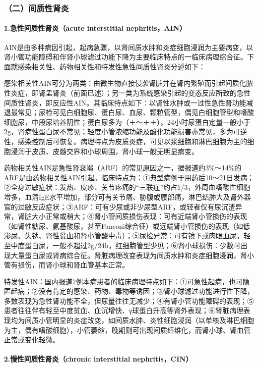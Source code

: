 \subsubsection{（二）间质性肾炎}

\paragraph{1.急性间质性肾炎（acute interstitial nephritis，AIN）}

AIN是由多种病因引起，起病急骤，以肾间质水肿和炎症细胞浸润为主要病变，以肾小管功能障碍和伴肾小球滤过功能下降为主要临床特点的一临床病理综合征。下面就感染相关性、药物相关性和特发性急性间质性肾炎分述如下：

感染相关性AIN可分为两类：由微生物直接侵袭肾脏并在肾内繁殖而引起间质化脓性炎症，即肾盂肾炎（前面已述）；另一类为系统感染引起的变态反应所致的急性间质性肾炎，即反应性AIN。其临床特点如下：以肾性水肿或一过性急性肾功能减退最常见；尿检可见白细胞尿、蛋白尿、血尿、颗粒管型，偶见白细胞管型和嗜酸细胞尿，中段尿培养阴性；蛋白尿多为（＋～＋＋），24小时尿蛋白定量一般小于2g，肾病性蛋白尿不常见；轻度小管浓缩功能及酸化功能损害亦常见，多为可逆性，感染控制后可恢复。病理特点为皮质炎症，可见以浆细胞和淋巴细胞为主的细胞浸润于皮质、皮髓交界和小球周围，肾小球一般无明显病变。

药物相关性AIN是急性肾衰竭（ARF）的常见原因之一，据报道约3\%～14\%的ARF是由药物相关性AIN引起。临床特点为：①典型病例于用药后10～21日发病；②全身过敏症状：发热、皮疹、关节疼痛的“三联症”约占1/3，外周血嗜酸性细胞增多，血清IgE水平增加，部分可有关节痛、胁腹或腰部痛，淋巴结肿大及肾外器官的过敏反应症状；③ARF：可有少尿或非少尿型ARF，或轻者仅有尿沉渣异常，肾脏大小正常或稍大；④肾小管间质损伤表现：可有近端肾小管损伤的表现（如肾性糖尿、氨基酸尿，甚至Fanconi综合征）或远端肾小管损伤的表现（如低渗尿、失钠、肾性贫血和肾小管酸中毒）；⑤尿检异常：可有镜下或肉眼血尿，轻至中度蛋白尿，一般不超过2g/24h，红细胞管型少见；⑥肾小球损伤：少数可出现大量蛋白尿或肾病综合征。肾脏病理改变表现为间质水肿和炎症细胞浸润，肾小管有损伤，而肾小球和肾血管基本正常。

特发性AIN：国内报道7例本病患者的临床病理特点如下：①可急性起病，也可隐匿起病；②没有肯定的感染、药物、毒物等诱因；③肾小球滤过功能进行性下降，多数表现为急性肾功能不全，但尿量往往无减少；④有肾小管功能障碍的表现；⑤患者往往伴有轻至中度贫血、血沉增快、γ球蛋白升高等肾外表现；⑥肾脏病理表现均为间质小管明显的炎症改变，如间质水肿、炎性细胞浸润（以单核及淋巴细胞为主，偶有嗜酸细胞），小管萎缩，晚期则可出现间质纤维化，而肾小球、肾血管正常或变化轻微。

\paragraph{2.慢性间质性肾炎（chronic interstitial nephritis，CIN）}

